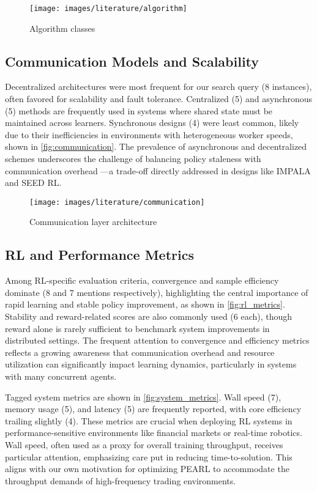 \begin{figure}
    \centering
    \texttt{[image: images/literature/algorithm]}
    \caption{Algorithm classes}
    \label{fig:algorithm}
\end{figure}

\subsection{Communication Models and Scalability}

Decentralized architectures were most frequent for our search query (8 instances), often favored for scalability and fault tolerance.
Centralized (5) and asynchronous (5) methods are frequently used in systems where shared state must be maintained across learners.
Synchronous designs (4) were least common, likely due to their inefficiencies in environments with heterogeneous worker speeds,
shown in \autoref{fig:communication}.
The prevalence of asynchronous and decentralized schemes underscores the challenge of balancing policy staleness with communication overhead
—a trade-off directly addressed in designs like IMPALA and SEED RL.

\begin{figure}
    \centering
    \texttt{[image: images/literature/communication]}
    \caption{Communication layer architecture}
    \label{fig:communication}
\end{figure}

\subsection{RL and Performance Metrics}

Among RL-specific evaluation criteria, convergence and sample efficiency dominate (8 and 7 mentions respectively),
highlighting the central importance of rapid learning and stable policy improvement, as shown in \autoref{fig:rl_metrics}.
Stability and reward-related scores are also commonly used (6 each), though reward alone is rarely sufficient to benchmark system improvements in distributed settings.
The frequent attention to convergence and efficiency metrics reflects a growing awareness that communication overhead and resource utilization can significantly
impact learning dynamics, particularly in systems with many concurrent agents.

Tagged system metrics are shown in \autoref{fig:system_metrics}.
Wall speed (7), memory usage (5), and latency (5) are frequently reported, with core efficiency trailing slightly (4).
These metrics are crucial when deploying RL systems in performance-sensitive environments like financial markets or real-time robotics.
Wall speed, often used as a proxy for overall training throughput, receives particular attention,
emphasizing care put in reducing time-to-solution.
This aligns with our own motivation for optimizing PEARL to accommodate the throughput demands of high-frequency trading environments.

